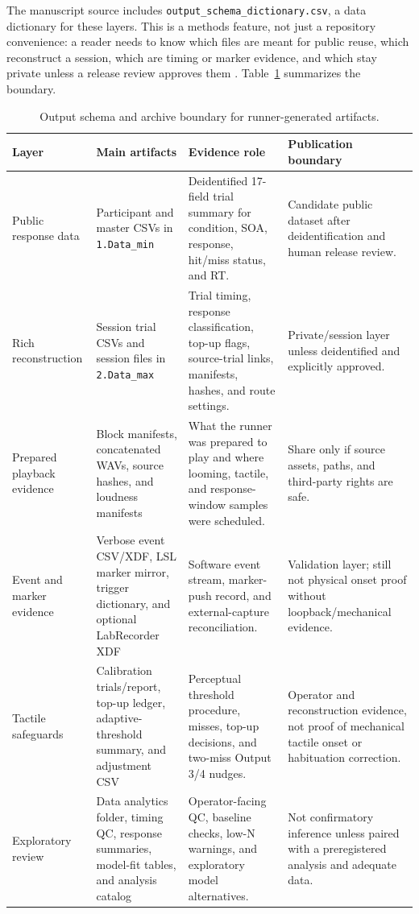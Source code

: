 \documentclass[pdflatex,sn-apa]{sn-jnl}
\newcommand{\code}[1]{\texttt{#1}}
\begin{document}
The manuscript source includes \code{output\_schema\_dictionary.csv}, a data dictionary for these layers. This is a methods feature, not just a repository convenience: a reader needs to know which files are meant for public reuse, which reconstruct a session, which are timing or marker evidence, and which stay private unless a release review approves them \citep{Ellis2024,Kieslich2017,Ghose2020}. Table~\ref{tab:output-schema} summarizes the boundary.

\begin{table}[t]
\caption{Output schema and archive boundary for runner-generated artifacts.}
\label{tab:output-schema}
\footnotesize
\begin{tabularx}{\textwidth}{>{\raggedright\arraybackslash}p{} >{\raggedright\arraybackslash}p{} >{\raggedright\arraybackslash}X >{\raggedright\arraybackslash}p{}}
\toprule
Layer & Main artifacts & Evidence role & Publication boundary \\
\midrule
Public response data & Participant and master CSVs in \code{1.Data\_min} & Deidentified 17-field trial summary for condition, SOA, response, hit/miss status, and RT. & Candidate public dataset after deidentification and human release review. \\
Rich reconstruction & Session trial CSVs and session files in \code{2.Data\_max} & Trial timing, response classification, top-up flags, source-trial links, manifests, hashes, and route settings. & Private/session layer unless deidentified and explicitly approved. \\
Prepared playback evidence & Block manifests, concatenated WAVs, source hashes, and loudness manifests & What the runner was prepared to play and where looming, tactile, and response-window samples were scheduled. & Share only if source assets, paths, and third-party rights are safe. \\
Event and marker evidence & Verbose event CSV/XDF, LSL marker mirror, trigger dictionary, and optional LabRecorder XDF & Software event stream, marker-push record, and external-capture reconciliation. & Validation layer; still not physical onset proof without loopback/mechanical evidence. \\
Tactile safeguards & Calibration trials/report, top-up ledger, adaptive-threshold summary, and adjustment CSV & Perceptual threshold procedure, misses, top-up decisions, and two-miss Output 3/4 nudges. & Operator and reconstruction evidence, not proof of mechanical tactile onset or habituation correction. \\
Exploratory review & Data analytics folder, timing QC, response summaries, model-fit tables, and analysis catalog & Operator-facing QC, baseline checks, low-N warnings, and exploratory model alternatives. & Not confirmatory inference unless paired with a preregistered analysis and adequate data. \\
\bottomrule
\end{tabularx}
\end{table}
\end{document}

